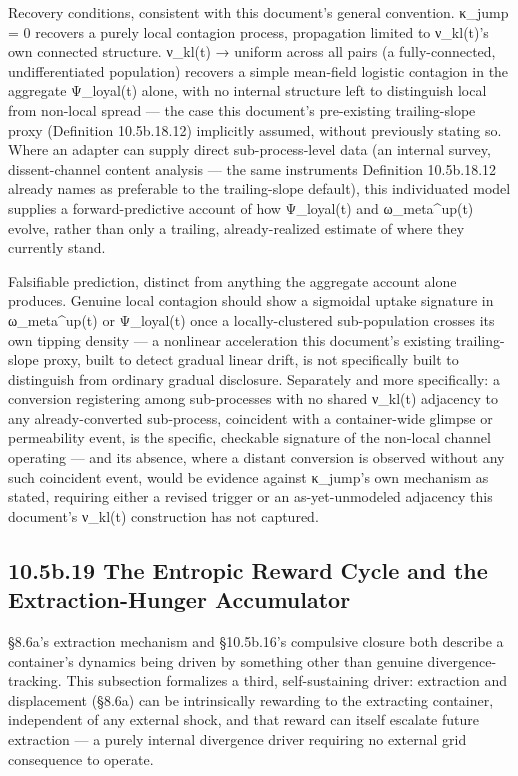 \documentclass[
]{article}
\begin{document}
Recovery conditions, consistent with this document's general convention.
κ\_jump = 0 recovers a purely local contagion process, propagation
limited to ν\_kl(t)'s own connected structure. ν\_kl(t) → uniform across
all pairs (a fully-connected, undifferentiated population) recovers a
simple mean-field logistic contagion in the aggregate Ψ\_loyal(t) alone,
with no internal structure left to distinguish local from non-local
spread --- the case this document's pre-existing trailing-slope proxy
(Definition 10.5b.18.12) implicitly assumed, without previously stating
so. Where an adapter can supply direct sub-process-level data (an
internal survey, dissent-channel content analysis --- the same
instruments Definition 10.5b.18.12 already names as preferable to the
trailing-slope default), this individuated model supplies a
forward-predictive account of how Ψ\_loyal(t) and ω\_meta\^{}up(t)
evolve, rather than only a trailing, already-realized estimate of where
they currently stand.

Falsifiable prediction, distinct from anything the aggregate account
alone produces. Genuine local contagion should show a sigmoidal uptake
signature in ω\_meta\^{}up(t) or Ψ\_loyal(t) once a locally-clustered
sub-population crosses its own tipping density --- a nonlinear
acceleration this document's existing trailing-slope proxy, built to
detect gradual linear drift, is not specifically built to distinguish
from ordinary gradual disclosure. Separately and more specifically: a
conversion registering among sub-processes with no shared ν\_kl(t)
adjacency to any already-converted sub-process, coincident with a
container-wide glimpse or permeability event, is the specific, checkable
signature of the non-local channel operating --- and its absence, where
a distant conversion is observed without any such coincident event,
would be evidence against κ\_jump's own mechanism as stated, requiring
either a revised trigger or an as-yet-unmodeled adjacency this
document's ν\_kl(t) construction has not captured.

\hypertarget{b.19-the-entropic-reward-cycle-and-the-extraction-hunger-accumulator}{%
\subsection{10.5b.19 The Entropic Reward Cycle and the Extraction-Hunger
Accumulator}\label{b.19-the-entropic-reward-cycle-and-the-extraction-hunger-accumulator}}

§8.6a's extraction mechanism and §10.5b.16's compulsive closure both
describe a container's dynamics being driven by something other than
genuine divergence-tracking. This subsection formalizes a third,
self-sustaining driver: extraction and displacement (§8.6a) can be
intrinsically rewarding to the extracting container, independent of any
external shock, and that reward can itself escalate future extraction
--- a purely internal divergence driver requiring no external grid
consequence to operate.
\end{document}
